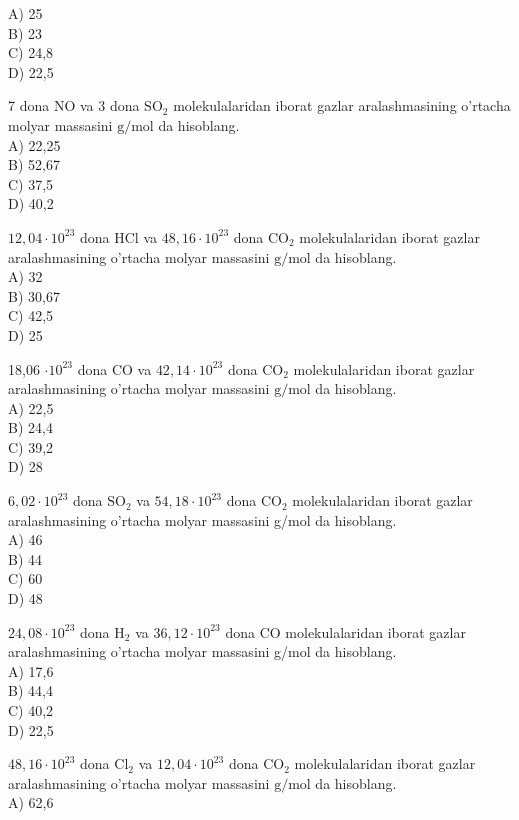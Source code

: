 A) 25\\
B) 23\\
C) 24,8\\
D) 22,5
  \item 7 dona NO va 3 dona $\mathrm{SO}_{2}$ molekulalaridan iborat gazlar aralashmasining o'rtacha molyar massasini $\mathrm{g} / \mathrm{mol}$ da hisoblang.\\
A) 22,25\\
B) 52,67\\
C) 37,5\\
D) 40,2
  \item $12,04 \cdot 10^{23}$ dona HCl va $48,16 \cdot 10^{23}$ dona $\mathrm{CO}_{2}$ molekulalaridan iborat gazlar aralashmasining o'rtacha molyar massasini $\mathrm{g} / \mathrm{mol}$ da hisoblang.\\
A) 32\\
B) 30,67\\
C) 42,5\\
D) 25
  \item 18,06 $\cdot 10^{23}$ dona CO va $42,14 \cdot 10^{23}$ dona $\mathrm{CO}_{2}$ molekulalaridan iborat gazlar aralashmasining o'rtacha molyar massasini $\mathrm{g} / \mathrm{mol}$ da hisoblang.\\
A) 22,5\\
B) 24,4\\
C) 39,2\\
D) 28
  \item $6,02 \cdot 10^{23}$ dona $\mathrm{SO}_{2}$ va $54,18 \cdot 10^{23}$ dona $\mathrm{CO}_{2}$ molekulalaridan iborat gazlar aralashmasining o'rtacha molyar massasini g/mol da hisoblang.\\
A) 46\\
B) 44\\
C) 60\\
D) 48
  \item $24,08 \cdot 10^{23}$ dona $\mathrm{H}_{2}$ va $36,12 \cdot 10^{23}$ dona CO molekulalaridan iborat gazlar aralashmasining o'rtacha molyar massasini g/mol da hisoblang.\\
A) 17,6\\
B) 44,4\\
C) 40,2\\
D) 22,5
  \item $48,16 \cdot 10^{23}$ dona $\mathrm{Cl}_{2}$ va $12,04 \cdot 10^{23}$ dona $\mathrm{CO}_{2}$ molekulalaridan iborat gazlar aralashmasining o'rtacha molyar massasini $\mathrm{g} / \mathrm{mol}$ da hisoblang.\\
A) 62,6\\
